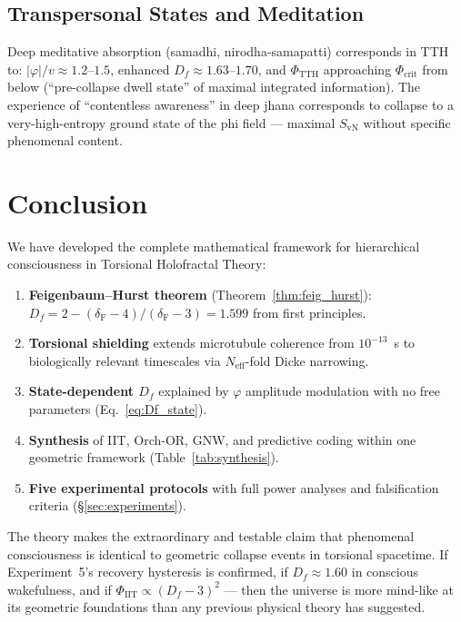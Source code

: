 \documentclass[12pt,a4paper]{article}
\newcommand{\phicrit}{\Phi_{\mathrm{crit}}}
\newcommand{\phiTTH}{\Phi_{\mathrm{TTH}}}
\newcommand{\phiIIT}{\Phi_{\mathrm{IIT}}}
\newcommand{\SvN}{S_{\mathrm{vN}}}
\newcommand{\Feig}{\delta_{\mathrm{F}}}
\numberwithin{equation}{section}
\begin{document}
\subsection{Transpersonal States and Meditation}

Deep meditative absorption (samadhi, nirodha-samapatti) corresponds in TTH to:
$|\varphi|/v \approx 1.2$--$1.5$, enhanced $D_f \approx 1.63$--$1.70$,
and $\phiTTH$ approaching $\phicrit$ from below
(``pre-collapse dwell state'' of maximal integrated information).
The experience of ``contentless awareness'' in deep jhana corresponds to
collapse to a very-high-entropy ground state of the phi field ---
maximal $\SvN$ without specific phenomenal content.

\section{Conclusion}
\label{sec:conclusion}

We have developed the complete mathematical framework for hierarchical
consciousness in Torsional Holofractal Theory:
\begin{enumerate}[leftmargin=2em]
\item \textbf{Feigenbaum--Hurst theorem} (Theorem~\ref{thm:feig_hurst}):
  $D_f = 2 - (\Feig-4)/(\Feig-3) = 1.599$ from first principles.
\item \textbf{Torsional shielding} extends microtubule coherence from
  $10^{-13}$~s to biologically relevant timescales via $N_{\mathrm{eff}}$-fold
  Dicke narrowing.
\item \textbf{State-dependent $D_f$} explained by $\varphi$ amplitude modulation
  with no free parameters (Eq.~\eqref{eq:Df_state}).
\item \textbf{Synthesis} of IIT, Orch-OR, GNW, and predictive coding within one
  geometric framework (Table~\ref{tab:synthesis}).
\item \textbf{Five experimental protocols} with full power analyses and
  falsification criteria (\S\ref{sec:experiments}).
\end{enumerate}

The theory makes the extraordinary and testable claim that phenomenal
consciousness is identical to geometric collapse events in torsional spacetime.
If Experiment~5's recovery hysteresis is confirmed, if $D_f \approx 1.60$
in conscious wakefulness, and if $\phiIIT \propto (D_f-3)^2$ --- then
the universe is more mind-like at its geometric foundations than
any previous physical theory has suggested.
\end{document}
